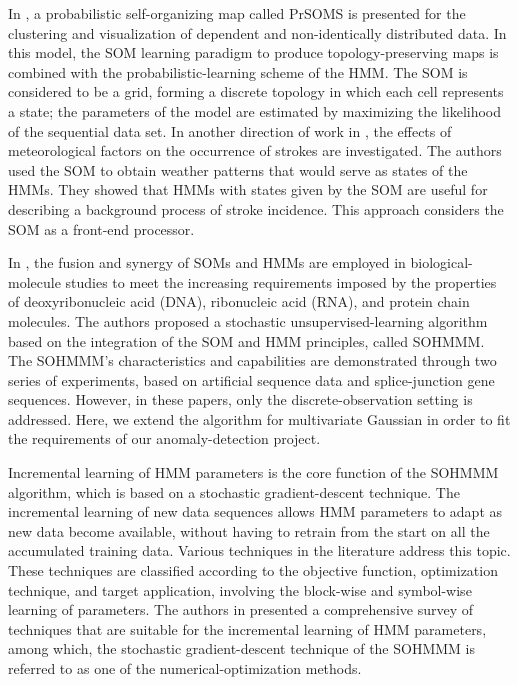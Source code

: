 In \citet{Lebbah2015}, a probabilistic self-organizing map called PrSOMS is presented for the clustering and visualization of dependent and non-identically distributed data. In this model, the SOM learning paradigm to produce topology-preserving maps is combined with the probabilistic-learning scheme of the HMM. The SOM is considered to be a grid, forming a discrete topology in which each cell represents a state; the parameters of the model are estimated by maximizing the likelihood of the sequential data set. In another direction of work in \citet{Morimoto2016}, the effects of meteorological factors on the occurrence of strokes are investigated. The authors used the SOM to obtain weather patterns that would serve as states of the HMMs. They showed that HMMs with states given by the SOM are useful for describing a background process of stroke incidence. This approach considers the SOM as a front-end processor.

In \citet{Ferles2008,Ferles2013,Ferles2017}, the fusion and synergy of SOMs and HMMs are employed in biological-molecule studies to meet the increasing requirements imposed by the properties of deoxyribonucleic acid (DNA), ribonucleic acid (RNA), and protein chain molecules. The authors proposed a stochastic unsupervised-learning algorithm based on the integration of the SOM and HMM principles, called SOHMMM. The SOHMMM's characteristics and capabilities are demonstrated through two series of experiments, based on artificial sequence data and splice-junction gene sequences. However, in these papers, only the discrete-observation setting is addressed. Here, we extend the algorithm for multivariate Gaussian in order to fit the requirements of our anomaly-detection project.

Incremental learning of HMM parameters is the core function of the SOHMMM algorithm, which is based on a stochastic gradient-descent technique. The incremental learning of new data sequences allows HMM parameters to adapt as new data become available, without having to retrain from the start on all the accumulated training data. Various techniques in the literature address this topic. These techniques are classified according to the objective function, optimization technique, and target application, involving the block-wise and symbol-wise learning of parameters. The authors in \citet{Khreich2012} presented a comprehensive survey of techniques that are suitable for the incremental learning of HMM parameters, among which, the stochastic gradient-descent technique of the SOHMMM is referred to as one of the numerical-optimization methods.

